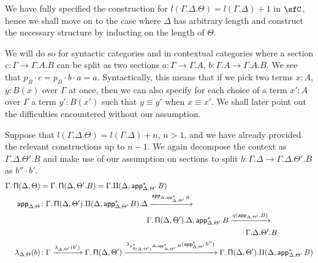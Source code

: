   We have fully specified the construction for
  $l(\Gamma.\Delta.\Theta)=l(\Gamma.\Delta)+1$ in $\sfC$, hence we shall move on
  to the case where $\Delta$ has arbitrary length and construct the necessary
  structure by inducting on the length of $\Theta$.

We will do so for syntactic categories and in contextual categories where a
section $c\colon\Gamma\rightarrow\Gamma.A.B$ can be split as
two sections $a\colon\Gamma\rightarrow\Gamma.A$,
$b\colon\Gamma.A\rightarrow\Gamma.A.B$.
We see that $p_B\cdot c=p_B\cdot b\cdot a=a$. Syntactically, this means that if
we pick two terms $x:A$, $y:B(x)$ over $\Gamma$ at once, then we can also
specify for each choice of a term $x':A$ over $\Gamma$ a term $y':B(x')$ such
that $y\equiv y'$ when $x\equiv x'$. We shall later point out the
difficulties encountered without our assumption.

\begin{construction}[Part 2]
  Suppose that
  $l(\Gamma.\Delta.\Theta)=l(\Gamma.\Delta)+n$, $n>1$, and we have already
  provided the relevant constructions up to $n-1$. We again decompose
  the context as $\Gamma.\Delta.\Theta'.B$ and make use of our assumption on
  sections to split $b\colon\Gamma.\Delta\rightarrow\Gamma.\Delta.\Theta'.B$ as
  $b''\cdot b'$.
  \begin{align*}
    \Gamma.\operatorname{\mathsf{\Pi}}(\Delta,\Theta)
    &=\Gamma.\operatorname{\mathsf{\Pi}}(\Delta,\Theta'.B)=\Gamma.\Pi(\Delta,\operatorname{\mathsf{app}}^*_{\Delta,\Theta'}B) \\
    \operatorname{\mathsf{app}}_{\Delta,\Theta}
    &\colon\Gamma.\operatorname{\mathsf{\Pi}}(\Delta,\Theta').\Pi(\Delta,\operatorname{\mathsf{app}}^*_{\Delta,\Theta'}B).\Delta
    \xrightarrow{\operatorname{\mathsf{app}}_{\Delta,\operatorname{\mathsf{app}}^*_{\Delta,\Theta'}B}} \\
    &\quad\quad\quad\quad\quad\quad\quad\quad\quad\quad\quad\quad\quad\quad
    \Gamma.\operatorname{\mathsf{\Pi}}(\Delta,\Theta').\Delta.\operatorname{\mathsf{app}}^*_{\Delta,\Theta'}B
    \xrightarrow{q(\operatorname{\mathsf{app}}_{\Delta,\Theta'},B)} \\
    &\quad\quad\quad\quad\quad\quad\quad\quad\quad\quad\quad\quad\quad\quad\quad\quad\quad\quad\quad\quad\quad\quad\quad\quad\quad\quad\quad
    \Gamma.\Delta.\Theta'.B \\
    \lambda_{\Delta,\Theta}(b)
    &\colon\Gamma
    \xrightarrow{\lambda_{\Delta,\Theta'}(b')}
    \Gamma.\operatorname{\mathsf{\Pi}}(\Delta,\Theta')
    \xrightarrow{\lambda_{p^*_{\operatorname{\mathsf{\Pi}}(\Delta,\Theta')}\Delta,\operatorname{\mathsf{app}}^*_{\Delta,\Theta'}B}(\operatorname{\mathsf{app}}_{\Delta,\Theta'}^*b'')}
    \Gamma.\operatorname{\mathsf{\Pi}}(\Delta,\Theta').\Pi(\Delta,\operatorname{\mathsf{app}}^*_{\Delta,\Theta'}B)
  \end{align*}

\end{construction}

